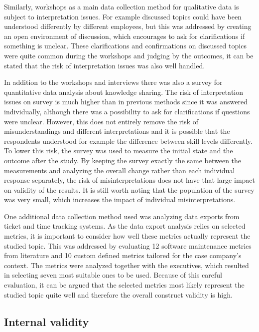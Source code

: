 Similarly, workshops as a main data collection method for qualitative data is subject to interpretation issues. For example discussed topics could have been understood differently by different employees, but
this was addressed by creating an open environment of discussion, which encourages to ask for clarifications if something is unclear. These clarifications and confirmations on discussed topics were quite
common during the workshops and judging by the outcomes, it can be stated that the risk of interpretation issues was also well handled.

In addition to the workshops and interviews there was also a survey for quantitative data analysis about knowledge sharing. The risk of interpretation issues on survey is much higher than in previous methods since
it was answered individually, although there was a possibility to ask for clarifications if questions were unclear. However, this does not entirely remove the risk of misunderstandings and different
interpretations and it is possible that the respondents understood for example the difference between skill levels differently.
To lower this risk, the survey was used to measure the initial state and the outcome after the
study. By keeping the survey exactly the same between the measurements and analyzing the overall change rather than each individual response separately, the risk of misinterpretations does not have
that large impact on validity of the results. It is still worth noting that the population of the survey was very small, which increases the impact of individual misinterpretations.

One additional data collection method used was analyzing data exports from ticket and time tracking systems. As the data export analysis relies on selected metrics, it is important to consider how well these metrics actually represent
the studied topic. This was addressed by evaluating 12 software maintenance metrics from literature and 10 custom defined metrics tailored for the case company's context. The metrics were analyzed together with
the executives, which resulted in selecting seven most suitable ones to be used. Because of this careful evaluation, it can be argued that the selected metrics most likely represent the studied topic quite well and therefore
the overall construct validity is high.

\subsection{Internal validity}

